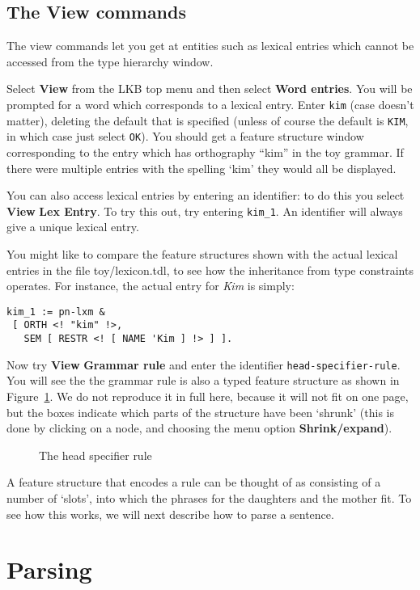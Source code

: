 \documentclass[12pt]{report}
\begin{document}
\subsection{The View commands}

The view commands let you get at entities such as lexical entries which cannot
be accessed from the type hierarchy window.  

Select {\bf View} from the LKB top menu and then select {\bf Word entries}.
You will be prompted for a word which corresponds to a lexical entry.
Enter {\tt kim} (case doesn't matter), deleting the default that
is specified (unless of course the default is {\tt KIM}, in which
case just select {\tt OK}).
You should get a feature structure window corresponding to the entry 
which has orthography ``kim'' in the toy grammar.
If there were multiple entries with the spelling `kim' they would all
be displayed. 

You can also access lexical entries by entering an identifier: to
do this you select {\bf View} {\bf Lex Entry}.  
To try this out, try entering {\tt kim\_1}.
An identifier will always
give a unique lexical entry.  

You might like 
to compare the feature structures shown with the actual lexical
entries in the file toy/lexicon.tdl, to see how the inheritance from type
constraints operates.  For instance, the actual entry for {\it Kim} is
simply:
\begin{verbatim}
kim_1 := pn-lxm & 
 [ ORTH <! "kim" !>,
   SEM [ RESTR <! [ NAME 'Kim ] !> ] ].
\end{verbatim}

Now try {\bf View} {\bf Grammar rule} and enter the identifier
{\tt head-specifier-rule}.  You will see the the grammar rule
is also a typed feature structure as shown in Figure~\ref{rulefs}.
We do not reproduce it in full here, because
it will not fit on one page, but the boxes indicate which parts of the
structure have been `shrunk' (this is done by clicking on a node,
and choosing the menu option {\bf Shrink/expand}).
\begin{figure}
\epsfxsize=4in
\caption{The head specifier rule}
\label{rulefs}
\end{figure}
A feature structure that encodes a rule can be thought of
as consisting of a number of `slots', into which the phrases for
the daughters and the mother fit.  To see how this works,
we will next describe how to parse a sentence.

\section{Parsing}
\end{document}
